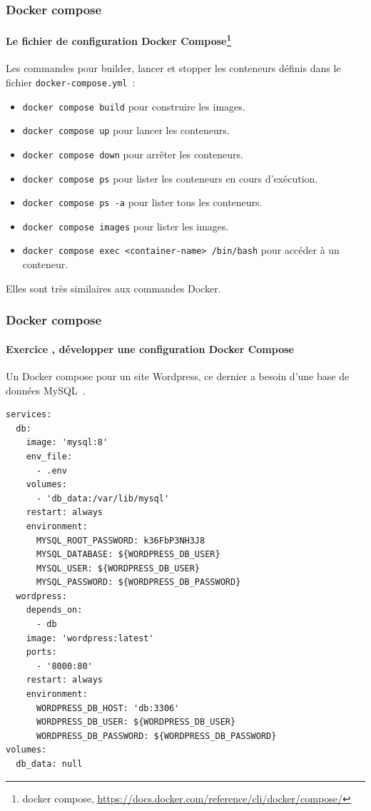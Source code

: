 \documentclass{beamer}
\begin{document}
    \begin{frame}[fragile]
        \transdissolve
        \frametitle{Docker compose}
        \framesubtitle{Le fichier de configuration Docker Compose\footnote{docker compose, \url{https://docs.docker.com/reference/cli/docker/compose/}}}
        Les commandes pour builder, lancer et stopper les conteneurs définis dans le fichier \lstinline{docker-compose.yml}~:
        \begin{itemize}
            \item \lstinline{docker compose build} pour construire les images.
            \item \lstinline{docker compose up} pour lancer les conteneurs.
            \item \lstinline{docker compose down} pour arrêter les conteneurs.
            \item \lstinline{docker compose ps} pour lister les conteneurs en cours d'exécution.
            \item \lstinline{docker compose ps -a} pour lister tous les conteneurs.
            \item \lstinline{docker compose images} pour lister les images.
            \item \lstinline{docker compose exec <container-name> /bin/bash} pour accéder à un conteneur.
        \end{itemize}
        Elles sont très similaires aux commandes Docker.
    \end{frame}

    \begin{frame}[fragile]
        \transdissolve
        \frametitle{Docker compose}
        \framesubtitle{Exercice \execcounterdispinc{}, développer une configuration Docker Compose}
        Un Docker compose pour un site Wordpress, ce dernier a besoin d'une base de données MySQL~.
        \pause
        \begin{lstlisting}[basicstyle=\ttfamily\tiny]
services:
  db:
    image: 'mysql:8'
    env_file:
      - .env
    volumes:
      - 'db_data:/var/lib/mysql'
    restart: always
    environment:
      MYSQL_ROOT_PASSWORD: k36FbP3NH3J8
      MYSQL_DATABASE: ${WORDPRESS_DB_USER}
      MYSQL_USER: ${WORDPRESS_DB_USER}
      MYSQL_PASSWORD: ${WORDPRESS_DB_PASSWORD}
  wordpress:
    depends_on:
      - db
    image: 'wordpress:latest'
    ports:
      - '8000:80'
    restart: always
    environment:
      WORDPRESS_DB_HOST: 'db:3306'
      WORDPRESS_DB_USER: ${WORDPRESS_DB_USER}
      WORDPRESS_DB_PASSWORD: ${WORDPRESS_DB_PASSWORD}
volumes:
  db_data: null
        \end{lstlisting}
    \end{frame}
\end{document}
